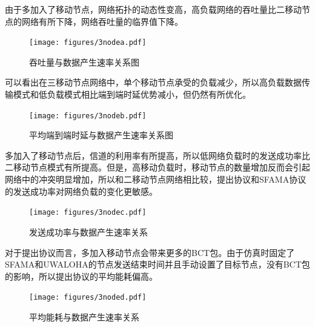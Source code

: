 由于多加入了移动节点，网络拓扑的动态性变高，高负载网络的吞吐量比二移动节点的网络有所下降，网络吞吐量的临界值下降。
\begin{figure}[!ht]
	\centering
	\texttt{[image: figures/3nodea.pdf]}
	\caption{
		吞吐量与数据产生速率关系图
	}
	\label{fig:example}
\end{figure}

可以看出在三移动节点网络中，单个移动节点承受的负载减少，所以高负载数据传输模式和低负载模式相比端到端时延优势减小，但仍然有所优化。
\begin{figure}[!ht]
	\centering
	\texttt{[image: figures/3nodeb.pdf]}
	\caption{
		平均端到端时延与数据产生速率关系图
	}
	\label{fig:example}
\end{figure}

多加入了移动节点后，信道的利用率有所提高，所以低网络负载时的发送成功率比二移动节点模式有所提高。但是，高移动负载时，移动节点的数量增加反而会引起网络中的冲突明显增加，所以和二移动节点网络相比较，提出协议和SFAMA协议的发送成功率对网络负载的变化更敏感。
\begin{figure}[!ht]
	\centering
	\texttt{[image: figures/3nodec.pdf]}
	\caption{
		发送成功率与数据产生速率关系
	}
	\label{fig:example}
\end{figure}

对于提出协议而言，多加入移动节点会带来更多的BCT包。由于仿真时固定了SFAMA和UWALOHA的节点发送结束时间并且手动设置了目标节点，没有BCT包的影响，所以提出协议的平均能耗偏高。
\begin{figure}[!ht]
	\centering
	\texttt{[image: figures/3noded.pdf]}
	\caption{
		平均能耗与数据产生速率关系
	}
	\label{fig:example}
\end{figure}

\endinput